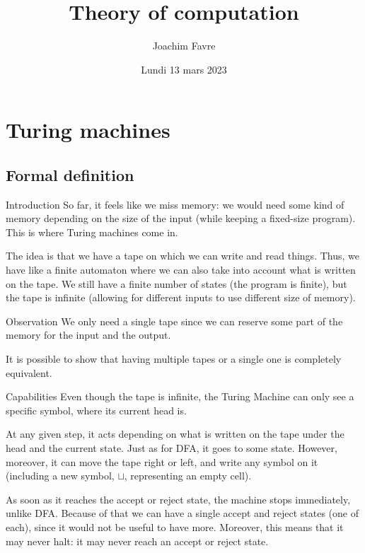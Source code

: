 \documentclass[a4paper]{article}
\title{Theory of computation}
\author{Joachim Favre}
\date{Lundi 13 mars 2023}
\begin{document}
\maketitle


\section{Turing machines}
\subsection{Formal definition}

\begin{parag}{Introduction}
    So far, it feels like we miss memory: we would need some kind of memory depending on the size of the input (while keeping a fixed-size program). This is where Turing machines come in.

    The idea is that we have a tape on which we can write and read things. Thus, we have like a finite automaton where we can also take into account what is written on the tape. We still have a finite number of states (the program is finite), but the tape is infinite (allowing for different inputs to use different size of memory).
\end{parag}

\begin{parag}{Observation}
    We only need a single tape since we can reserve some part of the memory for the input and the output.

    It is possible to show that having multiple tapes or a single one is completely equivalent.
\end{parag}

\begin{parag}{Capabilities}
    Even though the tape is infinite, the Turing Machine can only see a specific symbol, where its current head is.

    At any given step, it acts depending on what is written on the tape under the head and the current state. Just as for DFA, it goes to some state. However, moreover, it can move the tape right or left, and write any symbol on it (including a new symbol, $\sqcup$, representing an empty cell).

    As soon as it reaches the accept or reject state, the machine stops immediately, unlike DFA. Because of that we can have a single accept and reject states (one of each), since it would not be useful to have more. Moreover, this means that it may never halt: it may never reach an accept or reject state.
\end{parag}
\end{document}
